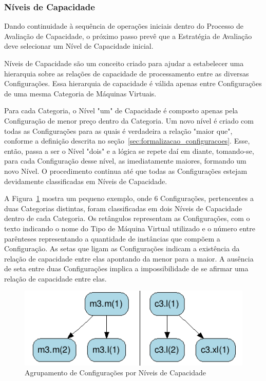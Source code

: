 \subsubsection{Níveis de Capacidade}
\label{subsec:processo_niveis_capacidade}
Dando continuidade à sequência de operações iniciais dentro do Processo de Avaliação 
de Capacidade, o próximo passo prevê que a Estratégia de Avaliação deve selecionar 
um Nível de Capacidade inicial. 

Níveis de Capacidade são um conceito criado para ajudar a estabelecer uma hierarquia 
sobre as relações de capacidade de processamento entre as diversas Configurações. 
Essa hierarquia de capacidade é válida apenas entre Configurações de uma mesma 
Categoria de Máquinas Virtuais. 

Para cada Categoria, o Nível "um" de Capacidade é composto apenas pela Configuração 
de menor preço dentro da Categoria. Um novo nível é criado com todas as Configurações 
para as quais é verdadeira a relação "maior que", conforme a definição descrita 
no seção~\ref{sec:formalizacao_configuracoes}. Esse, então, passa a ser o Nível 
"dois" e a lógica se repete daí em diante, tomando-se, para cada Configuração 
desse nível, as imediatamente maiores, formando um novo Nível. O procedimento 
continua até que todas as Configurações estejam devidamente classificadas em 
Níveis de Capacidade.

A Figura~\ref{fig_niveis_capacidade} mostra um pequeno exemplo, onde 6 Configurações,
pertencentes a duas Categorias distintas, foram classificadas em dois Níveis de 
Capacidade dentro de cada Categoria. Os retângulos representam as Configurações, 
com o texto indicando o nome do Tipo de Máquina Virtual utilizado e o número entre 
parênteses representando a quantidade de instâncias que compõem a Configuração. 
As setas que ligam as Configurações indicam a existência da relação de capacidade 
entre elas apontando da menor para a maior. A ausência de seta entre duas Configurações 
implica a impossibilidade de se afirmar uma relação de capacidade entre elas. 

\begin{figure}
  \caption{\label{fig_niveis_capacidade}Agrupamento de Configurações por Níveis de Capacidade}
  \begin{center}
    \includegraphics[scale=1]{img/exemplo-niveis-capacidade}
  \end{center}
\end{figure}

